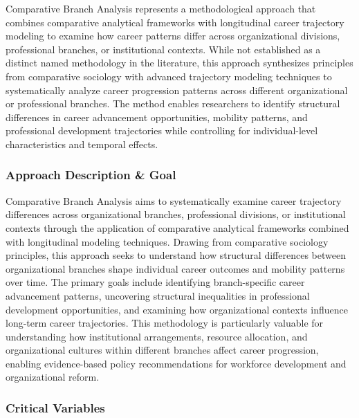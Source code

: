 \documentclass[main.tex]{subfiles}
\begin{document}
Comparative Branch Analysis represents a methodological approach that combines comparative analytical frameworks with longitudinal career trajectory modeling to examine how career patterns differ across organizational divisions, professional branches, or institutional contexts. While not established as a distinct named methodology in the literature, this approach synthesizes principles from comparative sociology\parencite{Wienclaw2021} with advanced trajectory modeling techniques\parencite{Senger2020, MOOCGBTM, Jones2001, ECB2021, Cheng2022} to systematically analyze career progression patterns across different organizational or professional branches. The method enables researchers to identify structural differences in career advancement opportunities, mobility patterns, and professional development trajectories while controlling for individual-level characteristics and temporal effects.

\subsubsection{Approach Description \& Goal}

Comparative Branch Analysis aims to systematically examine career trajectory differences across organizational branches, professional divisions, or institutional contexts through the application of comparative analytical frameworks combined with longitudinal modeling techniques. Drawing from comparative sociology principles\parencite{Wienclaw2021}, this approach seeks to understand how structural differences between organizational branches shape individual career outcomes and mobility patterns over time. The primary goals include identifying branch-specific career advancement patterns, uncovering structural inequalities in professional development opportunities, and examining how organizational contexts influence long-term career trajectories. This methodology is particularly valuable for understanding how institutional arrangements, resource allocation, and organizational cultures within different branches affect career progression, enabling evidence-based policy recommendations for workforce development and organizational reform\parencite{Cheng2022}.

\subsubsection{Critical Variables}
\end{document}
